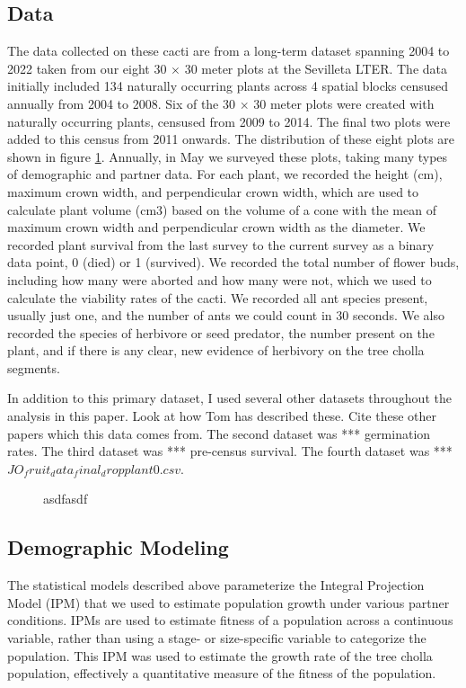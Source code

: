 \documentclass[12pt,a4paper]{article}
\begin{document}
\subsection*{Data}

The data collected on these cacti are from a long-term dataset spanning 2004 to 2022 taken from our eight 30 $\times$ 30 meter plots at the Sevilleta LTER. 
The data initially included 134 naturally occurring plants across 4 spatial blocks censused annually from 2004 to 2008.
Six of the 30 $\times$ 30 meter plots were created with naturally occurring plants, censused from 2009 to 2014. 
The final two plots were added to this census from 2011 onwards. 
The distribution of these eight plots are shown in figure \ref{fig:map}.
Annually, in May we surveyed these plots, taking many types of demographic and partner data. 
For each plant, we recorded the height (cm), maximum crown width, and perpendicular crown width, which are used to calculate plant volume (cm3) based on the volume of a cone with the mean of maximum crown width and perpendicular crown width as the diameter. 
We recorded plant survival from the last survey to the current survey as a binary data point, 0 (died) or 1 (survived). 
We recorded the total number of flower buds, including how many were aborted and how many were not, which we used to calculate the viability rates of the cacti. 
We recorded all ant species present, usually just one, and the number of ants we could count in 30 seconds. 
We also recorded the species of herbivore or seed predator, the number present on the plant, and if there is any clear, new evidence of herbivory on the tree cholla segments. 

In addition to this primary dataset, I used several other datasets throughout the analysis in this paper.  Look at how Tom has described these. Cite these other papers which this data comes from. 
The second dataset was *** germination rates.
The third dataset was *** pre-census survival.
The fourth dataset was *** $JO_fruit_data_final_dropplant0.csv$.

\begin{figure}[h]
	\caption{asdfasdf}
	\label{fig:map}
\end{figure}

\subsection*{Demographic Modeling}

The statistical models described above parameterize the Integral Projection Model (IPM) that we used to estimate population growth under various partner conditions.  
IPMs are used to estimate fitness of a population across a continuous variable, rather than using a stage- or size-specific variable to categorize the population. 
This IPM was used to estimate the growth rate of the tree cholla population, effectively a quantitative measure of the fitness of the population. 
\end{document}
